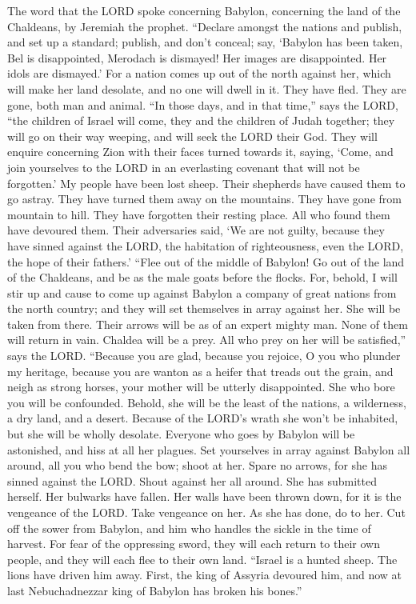  The word that the LORD spoke concerning Babylon, concerning
the land of the Chaldeans, by Jeremiah the prophet. 
``Declare amongst the nations and publish, and set up a standard;
publish, and don't conceal; say, `Babylon has been taken, Bel is
disappointed, Merodach is dismayed! Her images are disappointed. Her
idols are dismayed.'  For a nation comes up out of the north
against her, which will make her land desolate, and no one will dwell in
it. They have fled. They are gone, both man and animal. 
``In those days, and in that time,'' says the LORD, ``the children of
Israel will come, they and the children of Judah together; they will go
on their way weeping, and will seek the LORD their God. 
They will enquire concerning Zion with their faces turned towards it,
saying, `Come, and join yourselves to the LORD in an everlasting
covenant that will not be forgotten.'  My people have been
lost sheep. Their shepherds have caused them to go astray. They have
turned them away on the mountains. They have gone from mountain to hill.
They have forgotten their resting place.  All who found them
have devoured them. Their adversaries said, `We are not guilty, because
they have sinned against the LORD, the habitation of righteousness, even
the LORD, the hope of their fathers.'  ``Flee out of the
middle of Babylon! Go out of the land of the Chaldeans, and be as the
male goats before the flocks.  For, behold, I will stir up
and cause to come up against Babylon a company of great nations from the
north country; and they will set themselves in array against her. She
will be taken from there. Their arrows will be as of an expert mighty
man. None of them will return in vain.  Chaldea will be a
prey. All who prey on her will be satisfied,'' says the LORD.
 ``Because you are glad, because you rejoice, O you who
plunder my heritage, because you are wanton as a heifer that treads out
the grain, and neigh as strong horses,  your mother will be
utterly disappointed. She who bore you will be confounded. Behold, she
will be the least of the nations, a wilderness, a dry land, and a
desert.  Because of the LORD's wrath she won't be
inhabited, but she will be wholly desolate. Everyone who goes by Babylon
will be astonished, and hiss at all her plagues.  Set
yourselves in array against Babylon all around, all you who bend the
bow; shoot at her. Spare no arrows, for she has sinned against the LORD.
 Shout against her all around. She has submitted herself.
Her bulwarks have fallen. Her walls have been thrown down, for it is the
vengeance of the LORD. Take vengeance on her. As she has done, do to
her.  Cut off the sower from Babylon, and him who handles
the sickle in the time of harvest. For fear of the oppressing sword,
they will each return to their own people, and they will each flee to
their own land.  ``Israel is a hunted sheep. The lions have
driven him away. First, the king of Assyria devoured him, and now at
last Nebuchadnezzar king of Babylon has broken his bones.''

